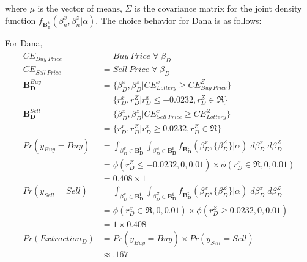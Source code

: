 \documentclass[11pt,a4paper]{article}
\newcommand\CE{\ensuremath{\mathit{CE}}}  %
\newcommand\Prob{\ensuremath{\mathit{Pr}}}  %
\begin{document}
\addtocounter{footnote}{-1}

\noindent where $\mu$ is the vector of means, $\Sigma$ is the covariance matrix for the joint density function $f_{\mathbf{B_n^t}}(\beta_n^x,\beta_n^z|\alpha)$.
The choice behavior for Dana is as follows:

\noindent For Dana,
\begin{align}
	\begin{split}
		{\CE}_{\mathit{Buy\ Price}} &= \mathit{Buy\ Price} \;\forall\; \beta_D\\
		{\CE}_{\mathit{Sell\ Price}} &= \mathit{Sell\ Price} \;\forall\; \beta_D\\[1.5ex]
		\mathbf{B_D^{\mathit{Buy}}} &= \{ \beta_D^x,\beta_D^z | {\CE}_{\mathit{Lottery}}^x \geq {\CE}_{\mathit{Buy\ Price}}^Z \}\\
		&= \{ r_D^x,r_D^Z | r_D^x \leq -0.0232, r_D^Z \in \Re\}\\[1.5ex]
		\mathbf{B_D^{\mathit{Sell}}} &= \{ \beta_D^x,\beta_D^z | {\CE}_{\mathit{Sell\ Price}}^x \geq {\CE}_{\mathit{Lottery}}^Z \}\\
		&= \{ r_D^x,r_D^Z | r_D^x \geq 0.0232, r_D^Z \in \Re\}\\[1.5ex]
		{\Prob}(y_{\mathit{Buy}} = \mathit{Buy}) &= \int_{\beta_D^x \in \mathbf{B^t_D}}\int_{\beta_D^Z \in \mathbf{B^t_D}} f_{\mathbf{B^t_D}}\!\left(\beta_D^x,\{\beta_D^Z\}|\alpha\right) \;d\beta_D^x \; d\beta_D^Z\\
		&= \phi(r_D^Z \leq -0.0232,0,0.01) \times \phi(r_D^x \in \Re,0,0.01)\\
		&= 0.408 \times 1\\
		{\Prob}(y_{\mathit{Sell}} = \mathit{Sell}) &= \int_{\beta_D^x \in \mathbf{B^t_D}}\int_{\beta_D^Z \in \mathbf{B^t_D}} f_{\mathbf{B^t_D}}\!\left(\beta_D^x,\{\beta_D^Z\}|\alpha\right) \;d\beta_D^x \; d\beta_D^Z\\
		&= \phi(r_D^x \in \Re,0,0.01) \times \phi(r_D^Z \geq 0.0232,0,0.01)\\
		&= 1 \times 0.408\\
	{\Prob}(\mathit{Extraction}_D) &= {\Prob}(y_{\mathit{Buy}} = \mathit{Buy}) \times {\Prob}(y_{\mathit{Sell}} = \mathit{Sell})\\
	&\approx .167
	\end{split}
\end{align}
\end{document}
